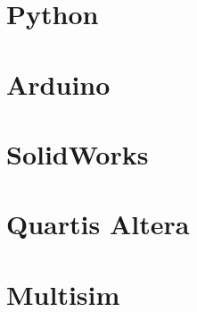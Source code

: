 \documentclass[12pt, letterpaper]{memoir}
\begin{document}
\part{Python}

\part{Arduino}


\part{SolidWorks}

\part{Quartis Altera}

\part{Multisim}
\end{document}
